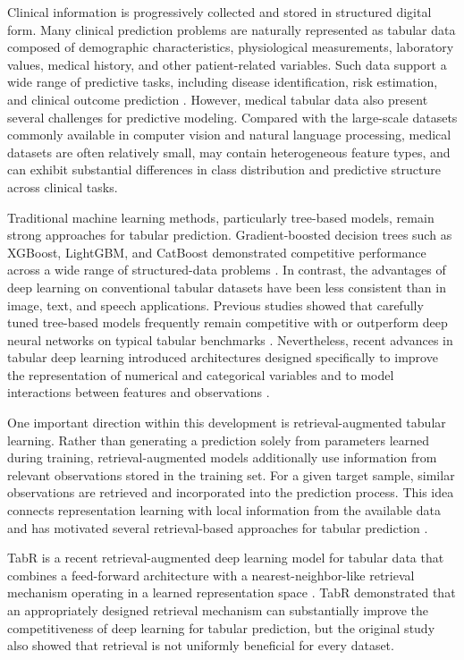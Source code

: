 \documentclass[11pt,a4paper,oneside, openany, reqno, chapter, nokorean]{oblivoir}
\theoremstyle{definition}
\theoremstyle{remark}
\numberwithin{equation}{chapter}
\theoremstyle{definition}
\theoremstyle{remark}
\theoremstyle{definition}
\begin{document}
Clinical information is progressively collected and stored in structured
digital form. Many clinical prediction problems are naturally represented as
tabular data composed of demographic characteristics, physiological
measurements, laboratory values, medical history, and other patient-related
variables. Such data support a wide range of predictive tasks, including
disease identification, risk estimation, and clinical outcome prediction
\cite{rajkomar2019mlmedicine}. However, medical tabular data also present
several challenges for predictive modeling. Compared with the large-scale
datasets commonly available in computer vision and natural language processing,
medical datasets are often relatively small, may contain heterogeneous feature
types, and can exhibit substantial differences in class distribution and
predictive structure across clinical tasks.

Traditional machine learning methods, particularly tree-based models, remain
strong approaches for tabular prediction. Gradient-boosted decision trees such
as XGBoost, LightGBM, and CatBoost demonstrated competitive performance
across a wide range of structured-data problems
\cite{chen2016xgboost,ke2017lightgbm,prokhorenkova2018catboost}. In contrast,
the advantages of deep learning on conventional tabular datasets have been less
consistent than in image, text, and speech applications. Previous studies
showed that carefully tuned tree-based models frequently remain competitive with
or outperform deep neural networks on typical tabular benchmarks
\cite{grinsztajn2022tree}. Nevertheless, recent advances in tabular deep
learning introduced architectures designed specifically to improve the
representation of numerical and categorical variables and to model interactions
between features and observations
\cite{gorishniy2021revisiting,gorishniy2022embeddings,somepalli2021saint}.

One important direction within this development is retrieval-augmented tabular
learning. Rather than generating a prediction solely from parameters learned
during training, retrieval-augmented models additionally use information from
relevant observations stored in the training set. For a given target sample,
similar observations are retrieved and incorporated into the prediction
process. This idea connects representation learning with local information from
the available data and has motivated several retrieval-based approaches for
tabular prediction
\cite{qin2021rim,kossen2021selfattention,gorishniy2024tabr}.

TabR is a recent retrieval-augmented deep learning model for tabular data that
combines a feed-forward architecture with a nearest-neighbor-like retrieval
mechanism operating in a learned representation space \cite{gorishniy2024tabr}.
TabR demonstrated that an appropriately designed retrieval mechanism can
substantially improve the competitiveness of deep learning for tabular
prediction, but the original study also showed that retrieval is not uniformly
beneficial for every dataset.
\end{document}
